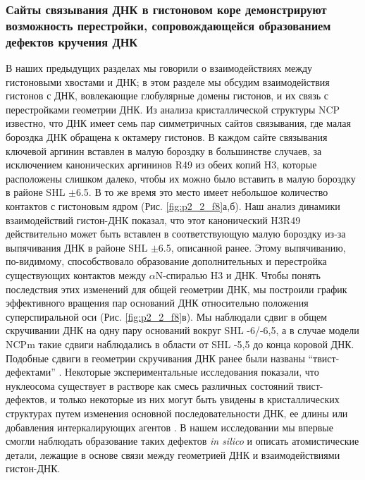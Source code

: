 \subsubsection{Сайты связывания ДНК в гистоновом коре демонстрируют возможность перестройки, сопровождающейся образованием дефектов кручения ДНК}
    В наших предыдущих разделах мы говорили о взаимодействиях между гистоновыми хвостами и ДНК; в этом разделе мы обсудим взаимодействия гистонов с ДНК, вовлекающие глобулярные домены гистонов, и их связь с перестройками геометрии ДНК. Из анализа кристаллической структуры NCP известно, что ДНК имеет семь пар симметричных сайтов связывания, где малая бороздка ДНК обращена к октамеру гистонов. В каждом сайте связывания ключевой аргинин вставлен в малую бороздку в большинстве случаев, за исключением канонических аргининов R49 из обеих копий H3, которые расположены слишком далеко, чтобы их можно было вставить в малую бороздку в районе SHL $\pm$6.5. В то же время это место имеет небольшое количество контактов с гистоновым ядром (Рис. \ref{fig:p2_2_f8}а,б). Наш анализ динамики взаимодействий гистон-ДНК показал, что этот канонический H3R49 действительно может быть вставлен в соответствующую малую бороздку из-за выпячивания ДНК в районе SHL $\pm$6.5, описанной ранее. Этому выпячиванию, по-видимому, способствовало образование дополнительных и перестройка существующих контактов между $\alpha$N-спиралью H3 и ДНК. Чтобы понять последствия этих изменений для общей геометрии ДНК, мы построили график эффективного вращения пар оснований ДНК относительно положения суперспиральной оси (Рис. \ref{fig:p2_2_f8}в). Мы наблюдали сдвиг в общем скручивании ДНК на одну пару оснований вокруг SHL -6/-6,5, а в случае модели NCPm такие сдвиги наблюдались в области от SHL -5,5 до конца коровой ДНК. Подобные сдвиги в геометрии скручивания ДНК ранее были названы ``твист-дефектами'' \cite{edayathumangalam_nucleosomes_2005}. Некоторые экспериментальные исследования показали, что нуклеосома существует в растворе как смесь различных состояний твист-дефектов, и только некоторые из них могут быть увидены в кристаллических структурах путем изменения основной последовательности ДНК, ее длины или добавления интеркалирующих агентов \cite{edayathumangalam_nucleosomes_2005}. В нашем исследовании мы впервые смогли наблюдать образование таких дефектов \textit{in silico} и описать атомистические детали, лежащие в основе связи между геометрией ДНК и взаимодействиями гистон-ДНК.
    
